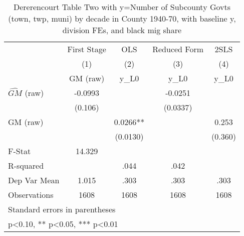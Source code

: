\begin{table}[htbp]\centering
\def\sym#1{\ifmmode^{#1}\else\(^{#1}\)\fi}
\caption{Dererencourt Table Two with y=Number of Subcounty Govts (town, twp, muni) by decade in County 1940-70, with baseline y, division FEs, and black mig share}
\begin{tabular}{l*{4}{c}}
\toprule
                    & First Stage   &         OLS   &Reduced Form   &        2SLS   \\
                    &\multicolumn{1}{c}{(1)}&\multicolumn{1}{c}{(2)}&\multicolumn{1}{c}{(3)}&\multicolumn{1}{c}{(4)}\\
                    &\multicolumn{1}{c}{GM  (raw)}&\multicolumn{1}{c}{y\_L0}&\multicolumn{1}{c}{y\_L0}&\multicolumn{1}{c}{y\_L0}\\
\midrule
$\hat{GM}$ (raw)    &     -0.0993   &               &     -0.0251   &               \\
                    &     (0.106)   &               &    (0.0337)   &               \\
\addlinespace
GM  (raw)           &               &      0.0266** &               &       0.253   \\
                    &               &    (0.0130)   &               &     (0.360)   \\
\midrule
F-Stat              &      14.329   &               &               &               \\
R-squared           &               &        .044   &        .042   &               \\
Dep Var Mean        &       1.015   &        .303   &        .303   &        .303   \\
Observations        &        1608   &        1608   &        1608   &        1608   \\
\bottomrule
\multicolumn{5}{l}{\footnotesize Standard errors in parentheses}\\
\multicolumn{5}{l}{\footnotesize * p<0.10, ** p<0.05, *** p<0.01}\\
\end{tabular}
\end{table}
